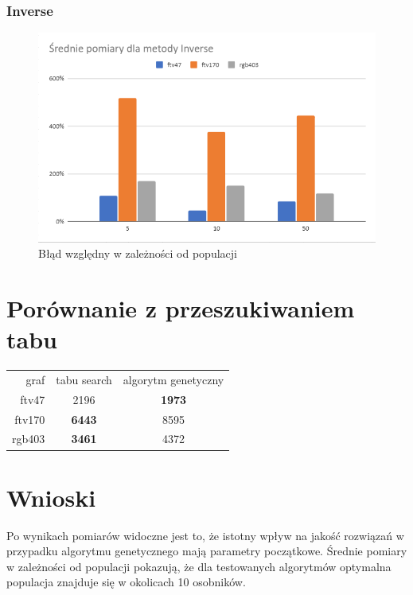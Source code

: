 \documentclass{article}
\begin{document}
\subsubsection{Inverse}
\begin{figure}[h!]
\centering
\includegraphics[width=\textwidth]{img/inverse.png}
\caption{Błąd względny w zależności od populacji}
\end{figure}


\section{Porównanie z przeszukiwaniem tabu}
    

\begin{table}[h]
\begin{center}

    \begin{tabular}{r c c}
        graf & tabu search & algorytm genetyczny \\
        ftv47 & 2196 & \textbf{1973} \\
        ftv170 & \textbf{6443} & 8595\\ 
        rgb403 & \textbf{3461} & 4372\\
    \end{tabular}
\end{center}

\end{table}

\section{Wnioski}
Po wynikach pomiarów widoczne jest to, że istotny wpływ na jakość rozwiązań w przypadku algorytmu genetycznego mają parametry początkowe. Średnie pomiary w zależności od populacji pokazują, że dla testowanych algorytmów optymalna populacja znajduje się w okolicach 10 osobników.
\end{document}
